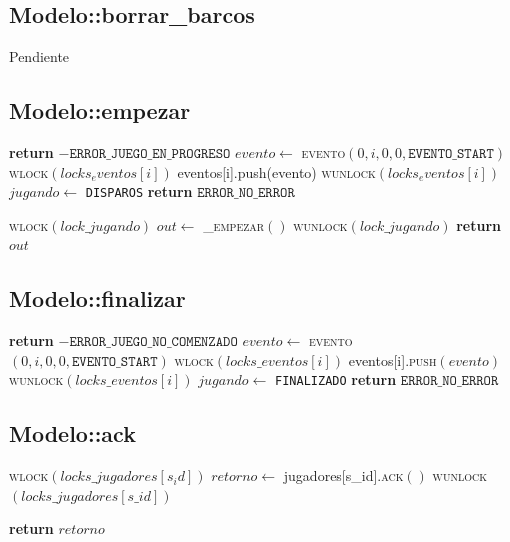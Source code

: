 \documentclass[a4paper,10pt,twoside]{article}
\newenvironment{pseudo}[1][]{%
    \vspace{0.5em}%
    \begin{algorithmic}%
}
{%
    \end{algorithmic}%
    \vspace{0.5em}%
}
\newcommand{\Fn}[2]{\textsc{#1}$(#2)$}
\newcommand{\PReturn}[1]{\textbf{return} $#1$}
\begin{document}
\subsection{Modelo::borrar\_barcos}

Pendiente


\subsection{Modelo::empezar}
\begin{pseudo}
		\State \PReturn{-\texttt{ERROR\_JUEGO\_EN\_PROGRESO}}
	\EndIf
			\State $evento  \leftarrow$ \Fn{evento}{0, i, 0, 0, \texttt{EVENTO\_START}}
			\State \Fn{wlock}{locks_eventos[i]}
			\State eventos[i].push(evento)
			\Fn{wunlock}{locks_eventos[i]}
		\EndIf
	\EndFor
	\State $jugando \leftarrow$ \texttt{DISPAROS}
	\PReturn{\texttt{ERROR\_NO\_ERROR}}
\EndProcedure

	\State \Fn{wlock}{lock\_jugando}
	\State $out \leftarrow$ \Fn{\_empezar}{}
	\State \Fn{wunlock}{lock\_jugando}
	\PReturn{out}
\EndProcedure
\end{pseudo}


\subsection{Modelo::finalizar}
\begin{pseudo}
	 \PReturn{-\texttt{ERROR\_JUEGO\_NO\_COMENZADO}} \EndIf
			\State $evento  \leftarrow$ \Fn{evento}{0, i, 0, 0, \texttt{EVENTO\_START}}
			\State \Fn{wlock}{locks\_eventos[i]}
			\State eventos[i].\Fn{push}{evento}
			\State \Fn{wunlock}{locks\_eventos[i]}
		\EndIf
	\EndFor
	\State $jugando \leftarrow$ \texttt{FINALIZADO}
	\State \PReturn{\texttt{ERROR\_NO\_ERROR}}
\EndProcedure
\end{pseudo}

\subsection{Modelo::ack}
\begin{pseudo}
	\State \Fn{wlock}{locks\_jugadores[s_id]}
	\State $retorno \leftarrow$ jugadores[s\_id].\Fn{ack}{}
	\State \Fn{wunlock}{locks\_jugadores[s\_id]}

	\State \PReturn{retorno}
\EndProcedure
\end{pseudo}
\end{document}
